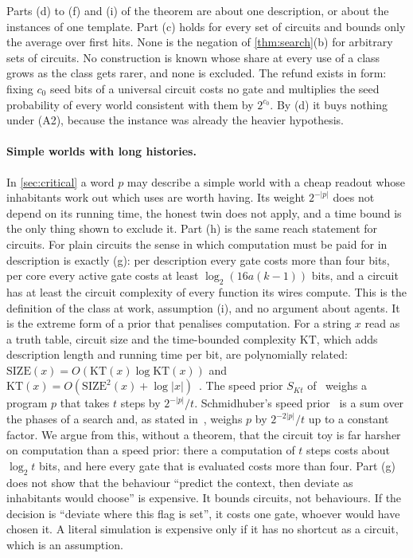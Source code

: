 Parts (d) to (f) and (i) of the theorem are about one description, or about the instances of one template.
Part (c) holds for every set of circuits and bounds only the average over first hits. None is the negation
of \cref{thm:search}(b) for arbitrary sets of circuits. No construction is known whose share at every
use of a class grows as the class gets rarer, and none is excluded. The refund exists in form: fixing $c_0$
seed bits of a universal circuit costs no gate and multiplies the seed probability of every world consistent
with them by $2^{c_0}$. By (d) it buys nothing under (A2), because the instance was already the heavier
hypothesis.

\paragraph{Simple worlds with long histories.} In \cref{sec:critical} a word $p$ may describe a simple world
with a cheap readout whose inhabitants work out which uses are worth having. Its weight $2^{-|p|}$ does not
depend on its running time, the honest twin does not apply, and a time bound is the only thing shown to
exclude it. Part (h) is the same reach statement for circuits. For plain circuits the sense in which
computation must be paid for in description is exactly (g): per description every gate costs more than four
bits, per core every active gate costs at least $\log_2(16a(k-1))$ bits, and a circuit has at least the
circuit complexity of every function its wires compute. This is the definition of the class at work,
assumption (i), and no argument about agents. It is the extreme form of a prior that penalises computation.
For a string $x$ read as a truth table, circuit size and the time-bounded complexity $\mathrm{KT}$, which adds
description length and running time per bit, are polynomially related:
$\mathrm{SIZE}(x)=O(\mathrm{KT}(x)\log\mathrm{KT}(x))$ and
$\mathrm{KT}(x)=O(\mathrm{SIZE}^2(x)+\log|x|)$~\cite{allender02}. The speed prior $S_{Kt}$ of~\cite{filan16}
weighs a program $p$ that takes $t$ steps by $2^{-|p|}/t$. Schmidhuber's speed prior~\cite{schmidhuber00} is a
sum over the phases of a search and, as stated in~\cite[Proposition~3]{filan16}, weighs $p$ by $2^{-2|p|}/t$
up to a constant factor. We argue from this, without a theorem, that the circuit toy is far harsher on
computation than a speed prior: there a computation of $t$ steps costs about $\log_2t$ bits, and here every
gate that is evaluated costs more than four. Part (g) does not show that the behaviour ``predict the context,
then deviate as inhabitants would choose'' is expensive. It bounds circuits, not behaviours. If the decision
is ``deviate where this flag is set'', it costs one gate, whoever would have chosen it. A literal simulation
is expensive only if it has no shortcut as a circuit, which is an assumption.

